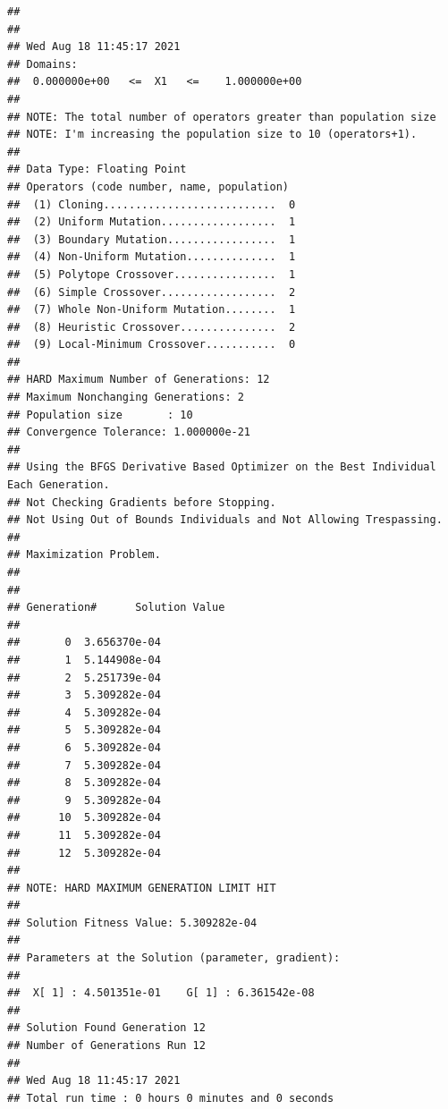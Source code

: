 \documentclass[
  ignorenonframetext,
]{beamer}
\newenvironment{Shaded}{\begin{snugshade}}{\end{snugshade}}
\newcommand{\AttributeTok}[1]{\textcolor[rgb]{0.77,0.63,0.00}{#1}}
\newcommand{\DecValTok}[1]{\textcolor[rgb]{0.00,0.00,0.81}{#1}}
\newcommand{\FunctionTok}[1]{\textcolor[rgb]{0.00,0.00,0.00}{#1}}
\newcommand{\NormalTok}[1]{#1}
\newcommand{\OtherTok}[1]{\textcolor[rgb]{0.56,0.35,0.01}{#1}}
\newcommand{\SpecialCharTok}[1]{\textcolor[rgb]{0.00,0.00,0.00}{#1}}
\begin{document}
\begin{frame}[fragile]{}
\protect\hypertarget{section-57}{}
\begin{Shaded}
\end{Shaded}

\begin{verbatim}
## 
## 
## Wed Aug 18 11:45:17 2021
## Domains:
##  0.000000e+00   <=  X1   <=    1.000000e+00 
## 
## NOTE: The total number of operators greater than population size
## NOTE: I'm increasing the population size to 10 (operators+1).
## 
## Data Type: Floating Point
## Operators (code number, name, population) 
##  (1) Cloning...........................  0
##  (2) Uniform Mutation..................  1
##  (3) Boundary Mutation.................  1
##  (4) Non-Uniform Mutation..............  1
##  (5) Polytope Crossover................  1
##  (6) Simple Crossover..................  2
##  (7) Whole Non-Uniform Mutation........  1
##  (8) Heuristic Crossover...............  2
##  (9) Local-Minimum Crossover...........  0
## 
## HARD Maximum Number of Generations: 12
## Maximum Nonchanging Generations: 2
## Population size       : 10
## Convergence Tolerance: 1.000000e-21
## 
## Using the BFGS Derivative Based Optimizer on the Best Individual Each Generation.
## Not Checking Gradients before Stopping.
## Not Using Out of Bounds Individuals and Not Allowing Trespassing.
## 
## Maximization Problem.
## 
## 
## Generation#      Solution Value
## 
##       0  3.656370e-04
##       1  5.144908e-04
##       2  5.251739e-04
##       3  5.309282e-04
##       4  5.309282e-04
##       5  5.309282e-04
##       6  5.309282e-04
##       7  5.309282e-04
##       8  5.309282e-04
##       9  5.309282e-04
##      10  5.309282e-04
##      11  5.309282e-04
##      12  5.309282e-04
## 
## NOTE: HARD MAXIMUM GENERATION LIMIT HIT
## 
## Solution Fitness Value: 5.309282e-04
## 
## Parameters at the Solution (parameter, gradient):
## 
##  X[ 1] : 4.501351e-01    G[ 1] : 6.361542e-08
## 
## Solution Found Generation 12
## Number of Generations Run 12
## 
## Wed Aug 18 11:45:17 2021
## Total run time : 0 hours 0 minutes and 0 seconds
\end{verbatim}
\end{frame}
\end{document}
